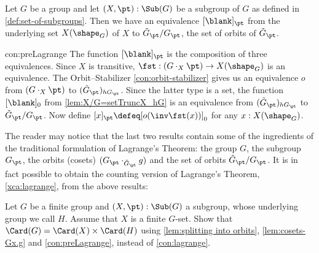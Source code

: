 \begin{construction}\label{con:preLagrange}
  Let $G$ be a group and let $(X,\pt):\Sub(G)$ be a subgroup of $G$ as defined
  in \cref{def:set-of-subgroups}. Then we have an equivalence
  $[\blank]_{\pt}$ from the underlying set $X(\sh_G)$ of $X$ to 
  $\tilde G_{\pt} /G_{\pt}$, the set of orbits of $\tilde G_{\pt}$. 
\end{construction}
\begin{implementation}{con:preLagrange}
The function $[\blank]_{\pt}$ is the composition of three equivalences.
Since $X$ is transitive, $\fst: (G\cdot_X {\pt})\to X(\sh_G)$ is an equivalence.
The Orbit--Stabilizer \cref{con:orbit-stabilizer} gives us an equivalence $o$
from $(G\cdot_X {\pt})$ to $(\tilde G_{\pt})_{hG_{\pt}}$. Since the latter type is a set,
the function $[\blank]_0$ from \cref{lem:X/G=setTruncX_hG} 
is an equivalence from $(\tilde G_{\pt})_{hG_{\pt}}$ to $\tilde G_{\pt} /G_{\pt}$.
Now define $[x]_{\pt} \defeq [o(\inv\fst(x))]_0$ for any $x:X(\sh_G)$.
\end{implementation}

The reader may notice that the last two results contain some of
the ingredients of the traditional formulation of Lagrange's Theorem:
the group $G$, the subgroup $G_{\pt}$, the orbits 
(cosets) $(G_{\pt} \cdot_{\tilde G_{\pt}} g)$ 
and the set of orbits $\tilde G_{\pt} /G_{\pt}$.
It is in fact possible to obtain the counting version of
Lagrange's Theorem, \cref{xca:lagrange}, from the above results:

\begin{xca}\label{xca:lagrange2}
Let $G$ be a finite group and $(X,\pt):\Sub(G)$ a subgroup,
whose underlying group we call $H$. 
Assume that $X$ is a finite $G$-set. Show that 
$\Card(G) = \Card(X) \times \Card(H)$ using \cref{lem:splitting into orbits},
\cref{lem:cosets-Gx.g} and \cref{con:preLagrange}, instead of
\cref{con:lagrange}.
\end{xca}

